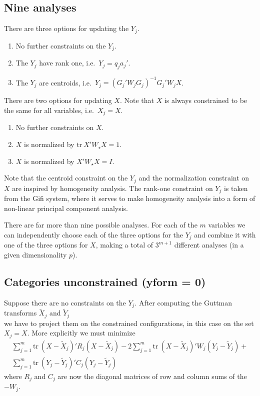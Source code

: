 \documentclass[
  12pt,
]{article}
\providecommand{\tightlist}{%
  \setlength{\itemsep}{0pt}\setlength{\parskip}{0pt}}
\begin{document}
\subsection{Nine analyses}\label{nine-analyses}

There are three options for updating the \(Y_j\).

\begin{enumerate}
\def\labelenumi{\arabic{enumi}.}
\setcounter{enumi}{-1}
\tightlist
\item
  No further constraints on the \(Y_j\).
\item
  The \(Y_j\) have rank one, i.e.~\(Y_j=q_ja_j'\).
\item
  The \(Y_j\) are centroids, i.e.~\(Y_j=(G_j'W_jG_j)^{-1}G_j'W_jX\).
\end{enumerate}

There are two options for updating \(X\). Note that \(X\) is always
constrained to be the same for all variables, i.e.~\(X_j=X\).

\begin{enumerate}
\def\labelenumi{\arabic{enumi}.}
\setcounter{enumi}{-1}
\tightlist
\item
  No further constraints on \(X\).
\item
  \(X\) is normalized by \(\text{tr}\ X'W_\star X=1\).
\item
  \(X\) is normalized by \(X'W_\star X=I\).
\end{enumerate}

Note that the centroid constraint on the \(Y_j\) and the normalization
constraint on \(X\) are inspired by homogeneity analysis. The rank-one
constraint on \(Y_j\) is taken from the Gifi system, where it serves
to make homogeneity analysis into a form of non-linear principal
component analysis.

There are far more than nine possible analyses. For each of the
\(m\) variables we can independently choose each of the three options for the
\(Y_j\) and combine it with one of the three options for \(X\), making a total
of \(3^{m+1}\) different analyses (in a given dimensionality \(p\)).

\subsection{Categories unconstrained (yform = 0)}\label{categories-unconstrained-yform-0}

Suppose there are no constraints on the \(Y_j\).
After computing the Guttman transforms \(\tilde X_j\) and \(\tilde Y_j\)\\
we have to project them on the constrained configurations, in this
case on the set \(X_j=X\). More explicitly we must minimize
\begin{multline}
\sum_{j=1}^m\text{tr}\ (X-\tilde X_j)'R_j(X-\tilde X_j)-2\sum_{j=1}^m\text{tr}\ (X-\tilde X_j)'W_j(Y_j-\tilde Y_j)+\\
\sum_{j=1}^m\text{tr}\ (Y_j-\tilde Y_j)'C_j(Y_j-\tilde Y_j)
\end{multline}
where \(R_j\) and \(C_j\) are now the diagonal matrices of row and column sums of the
\(-W_j\).
\end{document}
